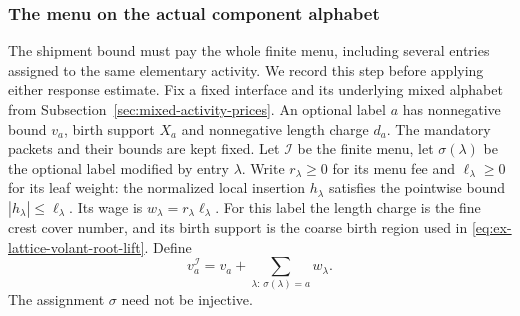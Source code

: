 \subsubsection{The menu on the actual component alphabet}
\label{sec:selected-menu-alphabet}

The shipment bound must pay the whole finite menu, including several
entries assigned to the same elementary activity. We record this step
before applying either response estimate. Fix a fixed interface and its
underlying mixed alphabet from Subsection~\ref{sec:mixed-activity-prices}.
An optional label $a$ has nonnegative bound $v_a$, birth support $X_a$
and nonnegative length charge $d_a$. The mandatory packets and their
bounds are kept fixed. Let $\mathcal I$ be the finite menu, let
$\sigma(\lambda)$ be the optional label modified by entry $\lambda$.
Write $r_\lambda\ge0$ for its menu fee and $\ell_\lambda\ge0$
for its leaf weight: the normalized local insertion $h_\lambda$
satisfies the pointwise bound $|h_\lambda|\le\ell_\lambda$.
Its wage is $w_\lambda=r_\lambda\ell_\lambda$.
For this label the length charge is the fine crest cover
number, and its birth support is the coarse birth region used in
\eqref{eq:ex-lattice-volant-root-lift}. Define
\begin{equation}\label{eq:selected-menu-augmentation}
 v_a^{\mathcal I}=v_a+
             \sum_{\lambda:\,\sigma(\lambda)=a}w_\lambda.
\end{equation}
The assignment $\sigma$ need not be injective.

